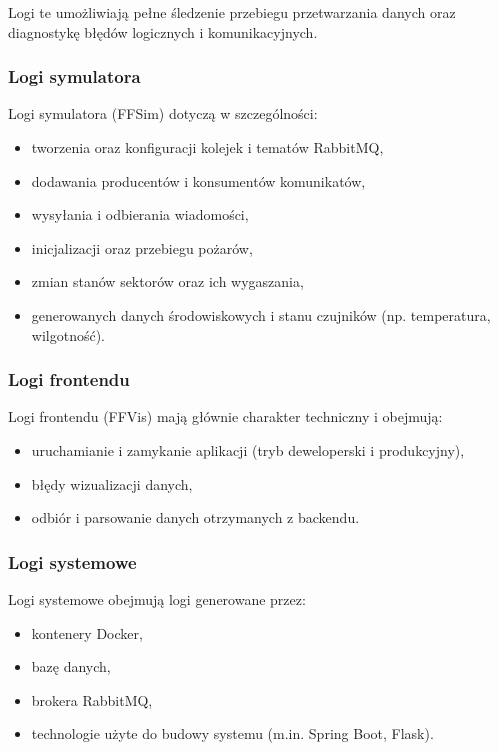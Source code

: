 Logi te umożliwiają pełne śledzenie przebiegu przetwarzania danych oraz diagnostykę błędów logicznych i komunikacyjnych.

\subsubsection*{Logi symulatora}

Logi symulatora (FFSim) dotyczą w szczególności:
\begin{itemize}
    \item tworzenia oraz konfiguracji kolejek i tematów RabbitMQ,
    \item dodawania producentów i konsumentów komunikatów,
    \item wysyłania i odbierania wiadomości,
    \item inicjalizacji oraz przebiegu pożarów,
    \item zmian stanów sektorów oraz ich wygaszania,
    \item generowanych danych środowiskowych i stanu czujników (np. temperatura, wilgotność).
\end{itemize}

\subsubsection*{Logi frontendu}

Logi frontendu (FFVis) mają głównie charakter techniczny i obejmują:
\begin{itemize}
    \item uruchamianie i zamykanie aplikacji (tryb deweloperski i produkcyjny),
    \item błędy wizualizacji danych,
    \item odbiór i parsowanie danych otrzymanych z backendu.
\end{itemize}

\subsubsection*{Logi systemowe}

Logi systemowe obejmują logi generowane przez:
\begin{itemize}
    \item kontenery Docker,
    \item bazę danych,
    \item brokera RabbitMQ,
    \item technologie użyte do budowy systemu (m.in. Spring Boot, Flask).
\end{itemize}

